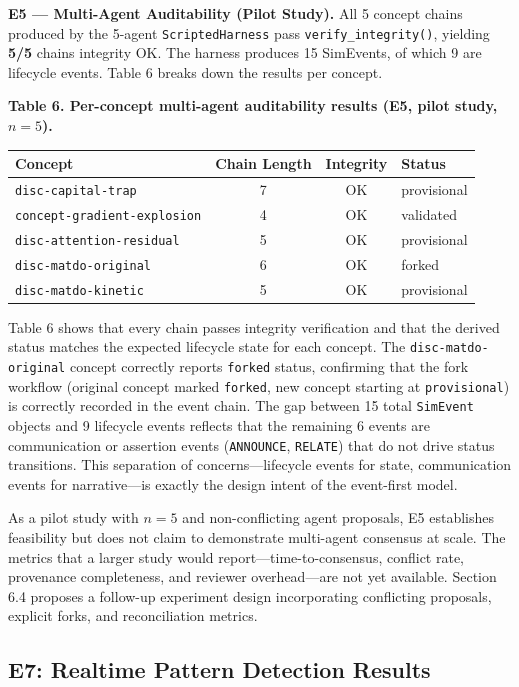 \textbf{E5 --- Multi-Agent Auditability (Pilot Study).} All 5 concept chains produced by the 5-agent \texttt{ScriptedHarness} pass \texttt{verify\_integrity()}, yielding \textbf{5/5} chains integrity OK. The harness produces 15 SimEvents, of which 9 are lifecycle events. Table 6 breaks down the results per concept.

\textbf{Table 6. Per-concept multi-agent auditability results (E5, pilot study, \(n=5\)).}

\begin{longtable}[]{@{}lccl@{}}
\toprule
Concept & Chain Length & Integrity & Status \\
\midrule
\endhead
\bottomrule
\endlastfoot
\texttt{disc-capital-trap} & 7 & OK & provisional \\
\texttt{concept-gradient-explosion} & 4 & OK & validated \\
\texttt{disc-attention-residual} & 5 & OK & provisional \\
\texttt{disc-matdo-original} & 6 & OK & forked \\
\texttt{disc-matdo-kinetic} & 5 & OK & provisional \\
\end{longtable}

Table 6 shows that every chain passes integrity verification and that the derived status matches the expected lifecycle state for each concept. The \texttt{disc-matdo-original} concept correctly reports \texttt{forked} status, confirming that the fork workflow (original concept marked \texttt{forked}, new concept starting at \texttt{provisional}) is correctly recorded in the event chain. The gap between 15 total \texttt{SimEvent} objects and 9 lifecycle events reflects that the remaining 6 events are communication or assertion events (\texttt{ANNOUNCE}, \texttt{RELATE}) that do not drive status transitions. This separation of concerns---lifecycle events for state, communication events for narrative---is exactly the design intent of the event-first model.

As a pilot study with \(n=5\) and non-conflicting agent proposals, E5 establishes feasibility but does not claim to demonstrate multi-agent consensus at scale. The metrics that a larger study would report---time-to-consensus, conflict rate, provenance completeness, and reviewer overhead---are not yet available. Section 6.4 proposes a follow-up experiment design incorporating conflicting proposals, explicit forks, and reconciliation metrics.

\subsection{E7: Realtime Pattern Detection Results}\label{e7-realtime-pattern-detection-results}

